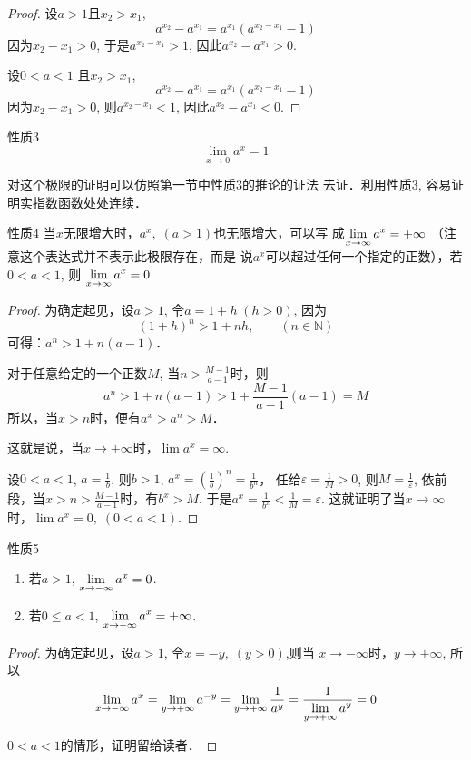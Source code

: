 \begin{proof}
设$a>1$且$x_2>x_1$,
\[a^{x_2}-a^{x_1}=a^{x_1}\left(a^{x_2-x_1}-1\right)\]
因为$x_2-x_1>0$, 于是$a^{x_2-x_1}>1$, 因此$a^{x_2}-a^{x_1}>0$.

设$0<a<1$ 且$x_2>x_1$,
\[a^{x_2}-a^{x_1}=a^{x_1}\left(a^{x_2-x_1}-1\right)\]
因为$x_2-x_1>0$, 则$a^{x_2-x_1}<1$, 因此$a^{x_2}-a^{x_1}<0$.  
\end{proof}

\begin{blk}{性质3}
\[\lim_{x\to 0} a^x=1\]
\end{blk}


对这个极限的证明可以仿照第一节中性质3的推论的证法
去证．利用性质3, 容易证明实指数函数处处连续．

\begin{blk}{性质4}
当$x$无限增大时，$a^x,\; (a>1)$也无限增大，可以写
成$\displaystyle\lim_{x\to\infty} a^x=+\infty$ （注意这个表达式并不表示此极限存在，而是
说$a^x$可以超过任何一个指定的正数），若$0<a<1$, 则
$\displaystyle\lim_{x\to\infty} a^x=0$
\end{blk}

\begin{proof}
  为确定起见，设$a>1$, 令$a=1+h\; (h>0)$, 因为
\[(1+h)^n>1+nh,\qquad (n\in\mathbb{N})\]
可得：$a^n>1+n(a-1)$．

对于任意给定的一个正数$M$, 当$n>\frac{M-1}{a-1}$时，则
\[a^n>1+n(a-1)>1+\frac{M-1}{a-1}(a-1)=M\]
所以，当$x>n$时，便有$a^x>a^n>M$．

这就是说，当$x\to +\infty$时，$\lim a^x=\infty$.

设$0<a<1$, $a=\frac{1}{b}$, 则$b>1$, $a^x=\left(\frac{1}{b}\right)^n=\frac{1}{b^n}$，
任给$\varepsilon=\frac{1}{M}>0$, 则$M=\frac{1}{\varepsilon}$, 依前段，当$x>n>\frac{M-1}{a-1}$时，有$b^x>M$. 于是$a^x=\frac{1}{b^x}<\frac{1}{M}=\varepsilon$. 这就证明了当$x\to\infty$时，$\lim a^x=0,\; (0<a<1)$.
\end{proof}

\begin{blk}{性质5}
\begin{enumerate}
  \item 若$a>1$, $\displaystyle\lim_{x\to-\infty} a^x=0$.
  \item 若$0\le a<1$, $\displaystyle\lim_{x\to-\infty} a^x=+\infty$.
\end{enumerate}  
\end{blk}

\begin{proof}
为确定起见，设$a>1$, 令$x=-y,\; (y>0)$,则当
$x\to-\infty$时，$y\to +\infty$, 所以
\[\displaystyle\lim_{x\to-\infty} a^x=\displaystyle\lim_{y\to +\infty} a^{-y}=\displaystyle\lim_{y\to +\infty}\dfrac{1}{a^y}=\dfrac{1}{\displaystyle\lim_{y\to +\infty}a^y}=0\]

$0<a<1$的情形，证明留给读者．
\end{proof}

